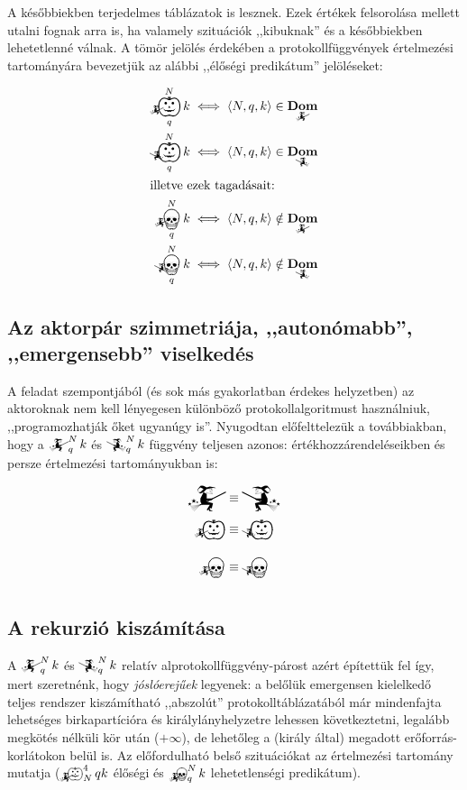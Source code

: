 \documentclass{article}
\DeclareMathOperator{\dom}{\mathbf{Dom}}
\newcommand{\angled}[1]{\left\langle#1\right\rangle}
\newcommand{\mainfunA}[3]{\mathwitch_{#2}^{#1}#3}
\newcommand{\mainfunB}[3]{\reversemathwitch_{#2}^{#1}#3}
\newcommand{\nomainfunA}[3]{{}_{\mathwitch}\!\!\!\!\bigskull^{#1}_{#2}#3}
\newcommand{\nomainfunB}[3]{{}_{\reversemathwitch}\!\!\!\!\bigskull^{#1}_{#2}#3}
\newcommand{\yesmainfunA}[3]{{}_{\mathwitch}\!\!\!\!\bigpumpkin^{#1}_{#2}#3}
\newcommand{\yesmainfunB}[3]{{}_{\reversemathwitch}\!\!\!\!\bigpumpkin^{#1}_{#2}#3}
\newcommand{\currymainfunA}{\mathwitch}
\newcommand{\currymainfunB}{\reversemathwitch}
\begin{document}
	A későbbiekben terjedelmes táblázatok is lesznek. Ezek értékek felsorolása mellett utalni fognak arra is, ha valamely szituációk ,,kibuknak'' és a későbbiekben lehetetlenné válnak. A tömör jelölés érdekében a protokollfüggvények értelmezési tartományára bevezetjük az alábbi ,,élőségi predikátum'' jelöléseket:

	\begin{align}
		\yesmainfunA Nqk &\iff \angled{N,q,k}\in\dom_{\mathwitch} \\
		\yesmainfunB Nqk &\iff \angled{N,q,k}\in\dom_{\reversemathwitch} \\\intertext{illetve ezek tagadásait:}
		\nomainfunA  Nqk &\iff \angled{N,q,k}\notin\dom_{\mathwitch} \\
		\nomainfunB  Nqk &\iff \angled{N,q,k}\notin\dom_{\reversemathwitch}
	\end{align}

	\subsection{Az aktorpár szimmetriája, ,,autonómabb'', ,,emergensebb'' viselkedés}

	A feladat szempontjából (és sok más gyakorlatban érdekes helyzetben) az aktoroknak nem kell lényegesen különböző protokollalgoritmust használniuk, ,,programozhatják őket ugyanúgy is''.
	Nyugodtan előfelttelezük a továbbiakban, hogy a  $\mainfunA Nqk$ és $\mainfunB Nqk$ függvény teljesen azonos: értékhozzárendeléseikben és persze értelmezési tartományukban is:

	\begin{align}
		\currymainfunA     &\equiv \currymainfunB     \\
		\yesmainfunA{}{}{} &\equiv \yesmainfunB{}{}{} \\
		\nomainfunA{}{}{}  &\equiv \nomainfunB{}{}{}
	\end{align}



	\subsection{A rekurzió kiszámítása}

	A $\mainfunA Nqk$ és $\mainfunB Nqk$ relatív alprotokollfüggvény-párost azért építettük fel így, mert szeretnénk, hogy \emph{jóslóerejűek} legyenek: a belőlük emergensen kielelkedő teljes rendszer kiszámítható ,,abszolút'' protokolltáblázatából már mindenfajta lehetséges birkapartícióra és királylányhelyzetre lehessen következtetni, legalább megkötés nélküli kör után ($+\infty$), de lehetőleg a (király által) megadott erőforrás-korlátokon belül is. Az előfordulható belső szituációkat az értelmezési tartomány mutatja ($\yesmainfunA4 Nqk$ élőségi és $\nomainfunA Nqk$ lehetetlenségi predikátum).
\end{document}
